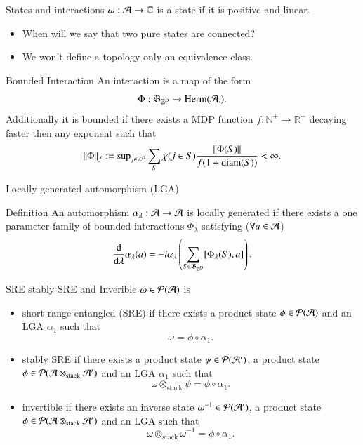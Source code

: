 \documentclass{beamer}
\begin{document}
\begin{frame}{States and interactions}
$\omega:\AA\rightarrow \CC$ is a state if it is positive and linear.\\
\pause
\begin{itemize}
\item When will we say that two pure states are connected?
\pause
\item We won't define a topology only an equivalence class.
\end{itemize}
\pause
\begin{block}{Bounded Interaction}
An interaction is a map of the form
\[\Phi:\mathfrak{B}_{\ZZ^D}\rightarrow\textrm{Herm}(\AA_{\cdot}).\]
\pause
Additionally it is bounded if there exists a MDP function $f:\mathbb{N}^+\rightarrow \mathbb{R}^+$ decaying faster then any exponent such that
\[\norm{\Phi}_f:=\textrm{sup}_{j\in\ZZ^D}\sum_{S}\chi(j\in S)\frac{\norm{\Phi(S)}}{f(1+\textrm{diam}(S))}<\infty.\]
\end{block}
\end{frame}

\begin{frame}{Locally generated automorphism (LGA)}
\begin{block}{Definition}
An automorphism $\alpha_\lambda:\AA\rightarrow \AA$ is locally generated if there exists a one parameter family of bounded interactions $\Phi_\lambda$ satisfying ($\forall a\in\AA$)
\[\frac{\dd}{\dd \lambda}\alpha_\lambda(a)=-i\alpha_\lambda\left(\sum_{S\in\mathfrak{B}_{\ZZ^D}}[\Phi_\lambda(S),a]\right).\]
\end{block}
\end{frame}

\begin{frame}{SRE stably SRE and Inverible}
$\omega\in\mathcal{P}(\AA)$ is
\pause
\begin{itemize}
\item short range entangled (SRE) if there exists a product state $\phi\in\mathcal{P}(\AA)$ and an LGA $\alpha_1$ such that
\[\omega=\phi\circ\alpha_1.\]
\pause
\item stably SRE if there exists a product state $\psi\in\mathcal{P}(\AA')$, a product state $\phi\in\mathcal{P}(\AA\otimes_{\text{stack}} \AA')$ and an LGA $\alpha_1$ such that
\[\omega\otimes_{\text{stack}}\psi =\phi\circ\alpha_1.\]
\pause
\item invertible if there exists an inverse state $\omega^{-1}\in\mathcal{P}(\AA')$, a product state $\phi\in\mathcal{P}(\AA\otimes_{\text{stack}}\AA')$ and an LGA such that
\[\omega\otimes_{\text{stack}}\omega^{-1}=\phi\circ\alpha_1.\]
\end{itemize}
\end{frame}
\end{document}
